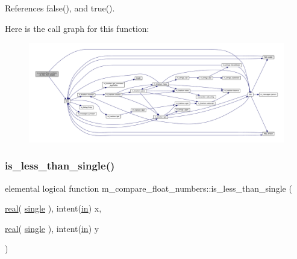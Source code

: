 References false(), and true().

Here is the call graph for this function\+:
\nopagebreak
\begin{figure}[H]
\begin{center}
\leavevmode
\includegraphics[width=350pt]{namespacem__compare__float__numbers_a36578a1fa0cf4ee3d29ded529dbd156c_cgraph}
\end{center}
\end{figure}
\mbox{\label{namespacem__compare__float__numbers_a82b07d4a5f9076d2dc0655c8733549b5}} 
\subsubsection{\texorpdfstring{is\+\_\+less\+\_\+than\+\_\+single()}{is\_less\_than\_single()}}
{\footnotesize\ttfamily elemental logical function m\+\_\+compare\+\_\+float\+\_\+numbers\+::is\+\_\+less\+\_\+than\+\_\+single (\begin{DoxyParamCaption}\item[{\hyperlink{read__watch_83_8txt_abdb62bde002f38ef75f810d3a905a823}{real}( \hyperlink{namespacem__compare__float__numbers_a5f122d46d6ad7d1cf0b899d9c855c498}{single} ), intent(\hyperlink{M__journal_83_8txt_afce72651d1eed785a2132bee863b2f38}{in})}]{x,  }\item[{\hyperlink{read__watch_83_8txt_abdb62bde002f38ef75f810d3a905a823}{real}( \hyperlink{namespacem__compare__float__numbers_a5f122d46d6ad7d1cf0b899d9c855c498}{single} ), intent(\hyperlink{M__journal_83_8txt_afce72651d1eed785a2132bee863b2f38}{in})}]{y }\end{DoxyParamCaption})\hspace{0.3cm}{\ttfamily [private]}}



